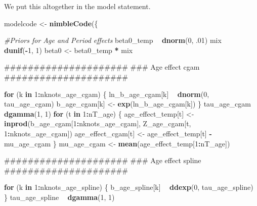 \documentclass[11pt,]{article}
\newenvironment{Shaded}{\begin{snugshade}}{\end{snugshade}}
\newcommand{\KeywordTok}[1]{\textcolor[rgb]{0.13,0.29,0.53}{\textbf{#1}}}
\newcommand{\DecValTok}[1]{\textcolor[rgb]{0.00,0.00,0.81}{#1}}
\newcommand{\StringTok}[1]{\textcolor[rgb]{0.31,0.60,0.02}{#1}}
\newcommand{\CommentTok}[1]{\textcolor[rgb]{0.56,0.35,0.01}{\textit{#1}}}
\newcommand{\ControlFlowTok}[1]{\textcolor[rgb]{0.13,0.29,0.53}{\textbf{#1}}}
\newcommand{\OperatorTok}[1]{\textcolor[rgb]{0.81,0.36,0.00}{\textbf{#1}}}
\newcommand{\NormalTok}[1]{#1}
\begin{document}
We put this altogether in the model statement.

\begin{Shaded}
\begin{Highlighting}[]
\NormalTok{modelcode <-}\StringTok{ }\KeywordTok{nimbleCode}\NormalTok{(\{}

  \CommentTok{#Priors for Age and Period effects}
\NormalTok{  beta0_temp }\OperatorTok{~}\StringTok{ }\KeywordTok{dnorm}\NormalTok{(}\DecValTok{0}\NormalTok{, .}\DecValTok{01}\NormalTok{)}
\NormalTok{  mix }\OperatorTok{~}\StringTok{ }\KeywordTok{dunif}\NormalTok{(}\OperatorTok{-}\DecValTok{1}\NormalTok{, }\DecValTok{1}\NormalTok{)}
\NormalTok{  beta0 <-}\StringTok{ }\NormalTok{beta0_temp }\OperatorTok{*}\StringTok{ }\NormalTok{mix}

\NormalTok{  #####################}
\NormalTok{  ### Age effect cgam}
\NormalTok{  #####################}

  \ControlFlowTok{for}\NormalTok{ (k }\ControlFlowTok{in} \DecValTok{1}\OperatorTok{:}\NormalTok{nknots_age_cgam) \{}
\NormalTok{    ln_b_age_cgam[k] }\OperatorTok{~}\StringTok{ }\KeywordTok{dnorm}\NormalTok{(}\DecValTok{0}\NormalTok{, tau_age_cgam)}
\NormalTok{    b_age_cgam[k] <-}\StringTok{ }\KeywordTok{exp}\NormalTok{(ln_b_age_cgam[k])}
\NormalTok{  \}}
\NormalTok{  tau_age_cgam }\OperatorTok{~}\StringTok{ }\KeywordTok{dgamma}\NormalTok{(}\DecValTok{1}\NormalTok{, }\DecValTok{1}\NormalTok{)}
  \ControlFlowTok{for}\NormalTok{ (t }\ControlFlowTok{in} \DecValTok{1}\OperatorTok{:}\NormalTok{nT_age) \{}
\NormalTok{    age_effect_temp[t] <-}\StringTok{ }\KeywordTok{inprod}\NormalTok{(b_age_cgam[}\DecValTok{1}\OperatorTok{:}\NormalTok{nknots_age_cgam],}
\NormalTok{                                 Z_age_cgam[t, }\DecValTok{1}\OperatorTok{:}\NormalTok{nknots_age_cgam])}
\NormalTok{    age_effect_cgam[t] <-}\StringTok{ }\NormalTok{age_effect_temp[t] }\OperatorTok{-}\StringTok{ }\NormalTok{mu_age_cgam}
\NormalTok{  \}}
\NormalTok{  mu_age_cgam <-}\StringTok{ }\KeywordTok{mean}\NormalTok{(age_effect_temp[}\DecValTok{1}\OperatorTok{:}\NormalTok{nT_age])}

\NormalTok{  #####################}
\NormalTok{  ### Age effect spline}
\NormalTok{  #####################}

  \ControlFlowTok{for}\NormalTok{ (k }\ControlFlowTok{in} \DecValTok{1}\OperatorTok{:}\NormalTok{nknots_age_spline) \{}
\NormalTok{    b_age_spline[k] }\OperatorTok{~}\StringTok{ }\KeywordTok{ddexp}\NormalTok{(}\DecValTok{0}\NormalTok{, tau_age_spline)}
\NormalTok{  \}}
\NormalTok{  tau_age_spline }\OperatorTok{~}\StringTok{ }\KeywordTok{dgamma}\NormalTok{(}\DecValTok{1}\NormalTok{, }\DecValTok{1}\NormalTok{)}


\end{Highlighting}
\end{Shaded}
\end{document}
